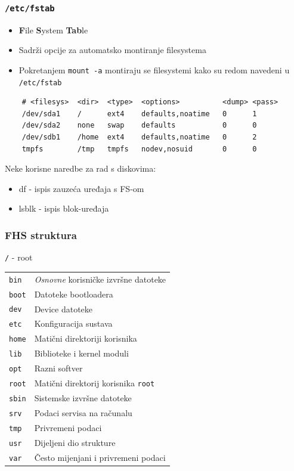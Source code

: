 \documentclass[t]{beamer}
\begin{document}
\begin{frame}[fragile]
	\frametitle{\texttt{/etc/fstab}}
	\begin{itemize}
		\item \textbf{F}ile \textbf{S}ystem \textbf{Tab}le
		\item Sadrži opcije za automatsko montiranje filesystema
		\item Pokretanjem \texttt{mount -a} montiraju se filesystemi kako su redom navedeni u \texttt{/etc/fstab}
	\end{itemize}
	\begin{verbatim}
	# <filesys>  <dir>  <type>  <options>          <dump> <pass>
	/dev/sda1    /      ext4    defaults,noatime   0      1
	/dev/sda2    none   swap    defaults           0      0
	/dev/sdb1    /home  ext4    defaults,noatime   0      2
	tmpfs        /tmp   tmpfs   nodev,nosuid       0      0
	\end{verbatim}

	\vfill
	Neke korisne naredbe za rad s diskovima:
	\begin{itemize}
		\item df - ispis zauzeća uređaja s FS-om
		\item lsblk - ispis blok-uređaja
	\end{itemize}
\end{frame}




\begin{frame}
	\frametitle{FHS struktura}
	\texttt{/} - root\\
	\begin{tabular}{p{3cm} l}
		\texttt{bin} & \emph{Osnovne} korisničke izvršne datoteke \\
		\texttt{boot} & Datoteke bootloadera \\
		\texttt{dev} & Device datoteke \\
		\texttt{etc} & Konfiguracija sustava \\
		\texttt{home} & Matični direktoriji korisnika \\
		\texttt{lib} & Biblioteke i kernel moduli \\
		\texttt{opt} & Razni softver \\
		\texttt{root} & Matični direktorij korisnika \texttt{root} \\
		\texttt{sbin} & Sistemske izvršne datoteke \\
		\texttt{srv} & Podaci servisa na računalu \\
		\texttt{tmp} & Privremeni podaci \\
		\texttt{usr} & Dijeljeni dio strukture \\
		\texttt{var} & Često mijenjani i privremeni podaci 
	\end{tabular}
\end{frame}
\end{document}
